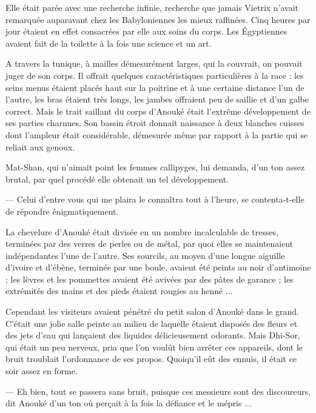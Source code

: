 \documentclass[a4paper, 11pt, oneside, polutonikogreek, french]{article}
\begin{document}
Elle était parée avec une recherche infinie, recherche que jamais Vietrix n'avait remarquée auparavant chez les Babyloniennes les mieux raffinées. Cinq heures par jour étaient en effet consacrées par elle aux soins du corps. Les Égyptiennes avaient fait de la toilette à la fois une science et un art.

A travers la tunique, à mailles démesurément larges, qui la couvrait, on pouvait juger de son corps. Il offrait quelques caractéristiques particulières à la race : les seins menus étaient placés haut sur la poitrine et à une certaine distance l'un de l'autre, les bras étaient très longs, les jambes offraient peu de saillie et d'un galbe correct. Mais le trait saillant du corps d'Anouké était l'extrême développement de ses parties charnues. Son bassin étroit donnait naissance à deux blanches cuisses dont l'ampleur était considérable, démesurée même par rapport à la partie qui se reliait aux genoux.

Mat-Shan, qui n'aimait point les femmes callipyges, lui demanda, d'un ton assez brutal, par quel procédé elle obtenait un tel développement.

--- Celui d'entre vous qui me plaira le connaîtra tout à l'heure, se contenta-t-elle de répondre énigmatiquement.

La chevelure d'Anouké était divisée en un nombre incalculable de tresses, terminées par des verres de perles ou de métal, par quoi elles se maintenaient indépendantes l'une de l'autre. Ses sourcils, au moyen d'une longue aiguille d'ivoire et d'ébène, terminée par une boule, avaient été peints au noir d'antimoine ; les lèvres et les pommettes avaient été avivées par des pâtes de garance ; les extrémités des mains et des pieds étaient rougies au henné ...

\bigskip
\centerline{\EightStarTaper}
\centerline{\EightStarTaper\EightStarTaper}
\bigskip

Cependant les visiteurs avaient pénétré du petit salon d'Anouké dans le grand. C'était une jolie salle peinte au milieu de laquelle étaient disposés des fleurs et des jets d'eau qui lançaient des liquides délicieusement odorants. Mais Dhi-Sor, qui était un peu nerveux, pria que l'on voulût bien arrêter ces appareils, dont le bruit troublait l'ordonnance de ses propos. Quoiqu'il eût des ennuis, il était ce soir assez en forme.

--- Eh bien, tout se passera sans bruit, puisque ces messieurs sont des discoureurs, dit Anouké d'un ton où perçait à la fois la défiance et le mépris ...
\end{document}
